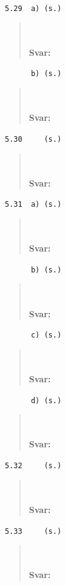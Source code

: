 \documentclass[a4paper]{article}
\newcommand{\tskcol}[1]{\textcolor{tskcol}{#1}}
\begin{document}
	\texttt{\tskcol{5.29~~a) (s.)}}
	\begin{quotation}
		\noindent
		\\ \\
		\textbf{Svar:}
	\end{quotation}
	
	\texttt{\tskcol{~~~~~~b) (s.)}}
	\begin{quotation}
		\noindent
		\\ \\
		\textbf{Svar:}
	\end{quotation}
	
	\texttt{\tskcol{5.30~~~~ (s.)}}
	\begin{quotation}
		\noindent
		\\ \\
		\textbf{Svar:}
	\end{quotation}
	
	\texttt{\tskcol{5.31~~a) (s.)}}
	\begin{quotation}
		\noindent
		\\ \\
		\textbf{Svar:}
	\end{quotation}
	
	\texttt{\tskcol{~~~~~~b) (s.)}}
	\begin{quotation}
		\noindent
		\\ \\
		\textbf{Svar:}
	\end{quotation}
	
	\texttt{\tskcol{~~~~~~c) (s.)}}
	\begin{quotation}
		\noindent
		\\ \\
		\textbf{Svar:}
	\end{quotation}
	
	\texttt{\tskcol{~~~~~~d) (s.)}}
	\begin{quotation}
		\noindent
		\\ \\
		\textbf{Svar:}
	\end{quotation}
	
	\texttt{\tskcol{5.32~~~~ (s.)}}
	\begin{quotation}
		\noindent
		\\ \\
		\textbf{Svar:}
	\end{quotation}
	
	\texttt{\tskcol{5.33~~~~ (s.)}}
	\begin{quotation}
		\noindent
		\\ \\
		\textbf{Svar:}
	\end{quotation}
\end{document}
